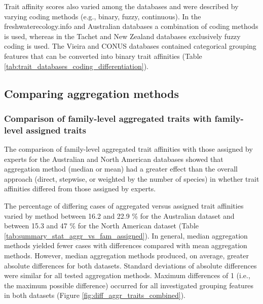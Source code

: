 \documentclass[12pt]{article}
\begin{document}
Trait affinity scores also varied among the databases and were described by varying coding methods (e.g., binary, fuzzy, continuous). In the freshwaterecology.info and Australian databases a combination of coding methods is used, whereas in the Tachet and New Zealand databases exclusively fuzzy coding is used. The Vieira and CONUS databases contained categorical grouping features that can be converted into binary trait affinities (Table \ref{tab:trait_databases_coding_differentiation}).


\subsection*{Comparing aggregation methods} 

\subsubsection*{Comparison of family-level aggregated traits with family-level assigned traits}
\label{sec:diff_trait_agg_chessman}

The comparison of family-level aggregated trait affinities with those assigned by experts for the Australian and North American databases showed that aggregation method (median or mean) had a greater effect than the overall approach (direct, stepwise, or weighted by the number of species) in whether trait affinities differed from those assigned by experts.

The percentage of differing cases of aggregated versus assigned trait affinities varied by method between 16.2 and 22.9 \% for the Australian dataset and between 15.3 and 47 \% for the North American dataset (Table \ref{tab:summary_stat_aggr_vs_fam_assigned}). In general, median aggregation methods yielded fewer cases with differences compared with mean aggregation methods. However, median aggregation methods produced, on average, greater absolute differences for both datasets. Standard deviations of absolute differences were similar for all tested aggregation methods. Maximum differences of 1 (i.e., the maximum possible difference) occurred for all investigated grouping features in both datasets (Figure \ref{fig:diff_aggr_traits_combined}).
\end{document}
